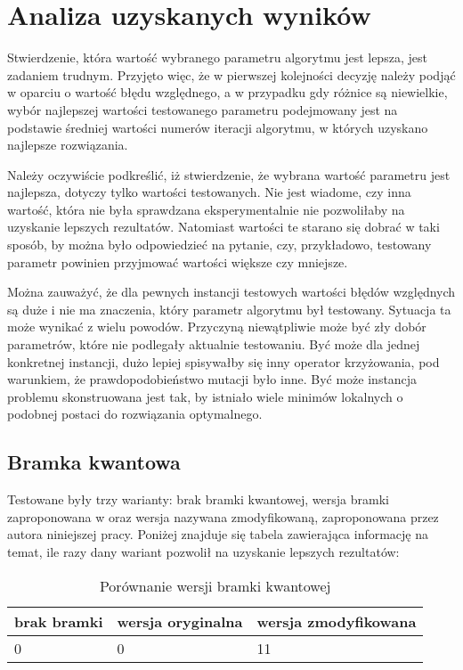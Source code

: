 \chapter{Analiza uzyskanych wyników}
\label{cha:analiza}

Stwierdzenie, która wartość wybranego parametru algorytmu jest lepsza, jest zadaniem trudnym. Przyjęto więc, że w pierwszej kolejności decyzję należy podjąć w oparciu o wartość błędu względnego, a w przypadku gdy różnice są niewielkie, wybór najlepszej wartości testowanego parametru podejmowany jest na podstawie średniej wartości numerów iteracji algorytmu, w których uzyskano najlepsze rozwiązania.

Należy oczywiście podkreślić, iż stwierdzenie, że wybrana wartość parametru jest najlepsza, dotyczy tylko wartości testowanych. Nie jest wiadome, czy inna wartość, która nie była sprawdzana eksperymentalnie nie pozwoliłaby na uzyskanie lepszych rezultatów. Natomiast wartości te starano się dobrać w taki sposób, by można było odpowiedzieć na pytanie, czy, przykładowo, testowany parametr powinien przyjmować wartości większe czy mniejsze.

Można zauważyć, że dla pewnych instancji testowych wartości błędów względnych są duże i nie ma znaczenia, który parametr algorytmu był testowany. Sytuacja ta może wynikać z wielu powodów. Przyczyną niewątpliwie może być zły dobór parametrów, które nie podlegały aktualnie testowaniu. Być może dla jednej konkretnej instancji, dużo lepiej spisywałby się inny operator krzyżowania, pod warunkiem, że prawdopodobieństwo mutacji było inne. Być może instancja problemu skonstruowana jest tak, by istniało wiele minimów lokalnych o podobnej postaci do rozwiązania optymalnego.

\section{Bramka kwantowa}
Testowane były trzy warianty: brak bramki kwantowej, wersja bramki zaproponowana w \cite{NPQGA} oraz wersja nazywana zmodyfikowaną, zaproponowana przez autora niniejszej pracy. Poniżej znajduje się tabela zawierająca informację na temat, ile razy dany wariant pozwolił na uzyskanie lepszych rezultatów:

\begin{table}[H]
\label{bramka_results}
\begin{center}
\begin{tabular}{l l l}
\hline
brak bramki & wersja oryginalna & wersja zmodyfikowana \\
\hline
0 & 0 & 11\\
\hline
\end{tabular}
\end{center}
\caption{Porównanie wersji bramki kwantowej}
\end{table}


